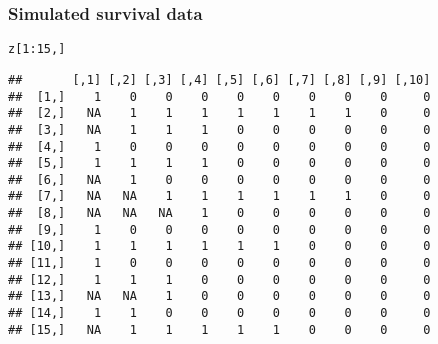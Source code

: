 \documentclass[color=usenames,dvipsnames]{beamer}\usepackage[]{graphicx}\usepackage[]{xcolor}
\makeatletter
\newcommand{\hlnum}[1]{\textcolor[rgb]{0.69,0.494,0}{#1}}%
\newcommand{\hlopt}[1]{\textcolor[rgb]{0,0,0}{#1}}%
\newcommand{\hldef}[1]{\textcolor[rgb]{0,0,0}{#1}}%
\newenvironment{kframe}{%
 \def\at@end@of@kframe{}%
 \ifinner\ifhmode%
  \def\at@end@of@kframe{\end{minipage}}%
  \begin{minipage}{\columnwidth}%
 \fi\fi%
 \def\FrameCommand##1{\hskip\@totalleftmargin \hskip-\fboxsep
 \colorbox{shadecolor}{##1}\hskip-\fboxsep
     \hskip-\linewidth \hskip-\@totalleftmargin \hskip\columnwidth}%
 \MakeFramed {\advance\hsize-\width
   \@totalleftmargin\z@ \linewidth\hsize
   \@setminipage}}%
 {\par\unskip\endMakeFramed%
 \at@end@of@kframe}
\newenvironment{knitrout}{}{} %
\makeatother
\begin{document}
\begin{frame}[fragile]
  \frametitle{Simulated survival data}
\begin{knitrout}\small
{}\color{fgcolor}\begin{kframe}
\begin{alltt}
\hldef{z[}\hlnum{1}\hlopt{:}\hlnum{15}\hldef{,]}
\end{alltt}
\begin{verbatim}
##       [,1] [,2] [,3] [,4] [,5] [,6] [,7] [,8] [,9] [,10]
##  [1,]    1    0    0    0    0    0    0    0    0     0
##  [2,]   NA    1    1    1    1    1    1    1    0     0
##  [3,]   NA    1    1    1    0    0    0    0    0     0
##  [4,]    1    0    0    0    0    0    0    0    0     0
##  [5,]    1    1    1    1    0    0    0    0    0     0
##  [6,]   NA    1    0    0    0    0    0    0    0     0
##  [7,]   NA   NA    1    1    1    1    1    1    0     0
##  [8,]   NA   NA   NA    1    0    0    0    0    0     0
##  [9,]    1    0    0    0    0    0    0    0    0     0
## [10,]    1    1    1    1    1    1    0    0    0     0
## [11,]    1    0    0    0    0    0    0    0    0     0
## [12,]    1    1    1    0    0    0    0    0    0     0
## [13,]   NA   NA    1    0    0    0    0    0    0     0
## [14,]    1    1    0    0    0    0    0    0    0     0
## [15,]   NA    1    1    1    1    1    0    0    0     0
\end{verbatim}
\end{kframe}
\end{knitrout}
\end{frame}







\end{document}
